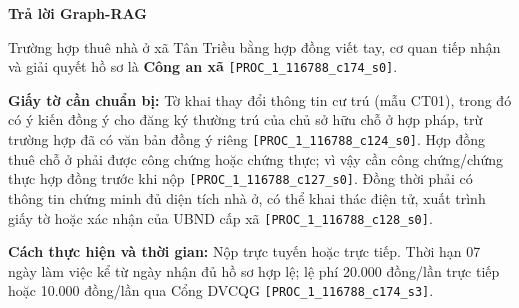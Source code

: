 \documentclass[11pt,a4paper]{article}
\newcommand{\src}[1]{\texttt{#1}}
\begin{document}
\textbf{Trả lời Graph-RAG}\par\nobreak
\begin{answerbox}
Trường hợp thuê nhà ở xã Tân Triều bằng hợp đồng viết tay, cơ quan tiếp nhận và giải quyết hồ sơ là \textbf{Công an xã} \src{[PROC\_1\_116788\_c174\_s0]}.

\textbf{Giấy tờ cần chuẩn bị:} Tờ khai thay đổi thông tin cư trú (mẫu CT01), trong đó có ý kiến đồng ý cho đăng ký thường trú của chủ sở hữu chỗ ở hợp pháp, trừ trường hợp đã có văn bản đồng ý riêng \src{[PROC\_1\_116788\_c124\_s0]}. Hợp đồng thuê chỗ ở phải được công chứng hoặc chứng thực; vì vậy cần công chứng/chứng thực hợp đồng trước khi nộp \src{[PROC\_1\_116788\_c127\_s0]}. Đồng thời phải có thông tin chứng minh đủ diện tích nhà ở, có thể khai thác điện tử, xuất trình giấy tờ hoặc xác nhận của UBND cấp xã \src{[PROC\_1\_116788\_c128\_s0]}.

\textbf{Cách thực hiện và thời gian:} Nộp trực tuyến hoặc trực tiếp. Thời hạn 07 ngày làm việc kể từ ngày nhận đủ hồ sơ hợp lệ; lệ phí 20.000 đồng/lần trực tiếp hoặc 10.000 đồng/lần qua Cổng DVCQG \src{[PROC\_1\_116788\_c174\_s3]}.
\end{answerbox}
\end{document}
